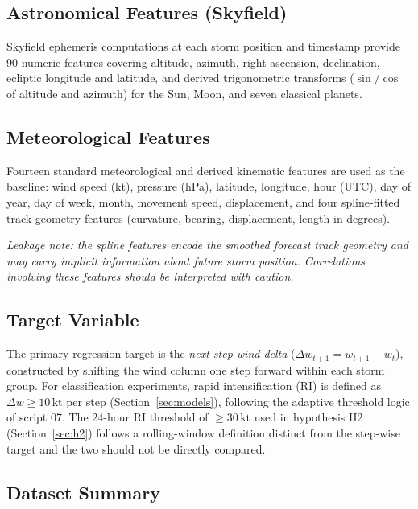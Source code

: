\documentclass[12pt,a4paper]{article}
\newcommand{\caution}[1]{\textcolor{notecolor}{\textit{#1}}}
\begin{document}
\subsection{Astronomical Features (Skyfield)}

Skyfield ephemeris computations at each storm position and timestamp provide 90
numeric features covering altitude, azimuth, right ascension, declination,
ecliptic longitude and latitude, and derived trigonometric transforms
($\sin/\cos$ of altitude and azimuth) for the Sun, Moon, and seven classical
planets.

\subsection{Meteorological Features}

Fourteen standard meteorological and derived kinematic features are used as the
baseline: wind speed (kt), pressure (hPa), latitude, longitude, hour (UTC),
day of year, day of week, month, movement speed, displacement, and four
spline-fitted track geometry features (curvature, bearing, displacement,
length in degrees).

\caution{Leakage note: the spline features encode the smoothed forecast track
geometry and may carry implicit information about future storm position.
Correlations involving these features should be interpreted with caution.}

\subsection{Target Variable}

The primary regression target is the \textit{next-step wind delta}
($\Delta w_{t+1} = w_{t+1} - w_t$), constructed by shifting the wind column
one step forward within each storm group.
For classification experiments, rapid intensification (RI) is defined as
$\Delta w \geq 10\,\text{kt}$ per step (Section~\ref{sec:models}), following
the adaptive threshold logic of script 07.
The 24-hour RI threshold of $\geq 30\,\text{kt}$ used in hypothesis H2
(Section~\ref{sec:h2}) follows a rolling-window definition distinct from
the step-wise target and the two should not be directly compared.

\subsection{Dataset Summary}
\end{document}
